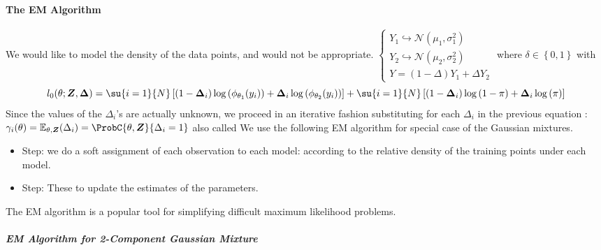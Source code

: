 \paragraph{The EM Algorithm}
We would like to model the density of the data points, and  would not be appropriate.
$
\begin{cases}
	Y_{1}\hookrightarrow\mathcal{N}(\mu_{1}, \sigma_{1}^{2})\\
	Y_{2}\hookrightarrow\mathcal{N}(\mu_{2}, \sigma_{2}^{2})\\
	Y = (1-\Delta)Y_{1} + \Delta Y_{2}
\end{cases}
$ 
where $\delta\in\left\{0,1\right\}$ with \\
$$
l_{0}(\theta;\bm{Z},\bm{\Delta}) = \su{{i=1}}{N} \left[(1-\bm{\Delta}_{i})\log\left(
\phi_{\theta_{1}}(y_{i})\right) +\bm{\Delta}_{i}\log\left( \phi_{\theta_{2}}(y_{i})\right) 
\right] + \su{{i=1}}{N} \left[(1-\bm{\Delta}_{i})\log\left( 1-\pi\right) +
\bm{\Delta}_{i}\log\left(\pi\right) \right]
$$
Since the values of the $\Delta_{i}$'s are actually unknown, we proceed in an iterative fashion
substituting for each $\Delta_{i}$ in the previous equation : 
$\gamma_{i}(\theta)=\mathbb{E}_{\theta,\bm{Z}}(\Delta_{i}) = \ProbC{\theta,\bm{Z}}{\Delta_{i}=1}$
also called 
We use the following EM algorithm for special case of the Gaussian mixtures.
\begin{itemize}
	\item {} Step: we do a soft assignment of each observation to each model:
		according to the relative density of the training points under each model.
	\item {} Step: These  to update the estimates of the parameters.
\end{itemize}
The EM algorithm is a popular tool for simplifying difficult maximum likelihood problems.
\subparagraph{EM Algorithm for 2-Component Gaussian Mixture}
